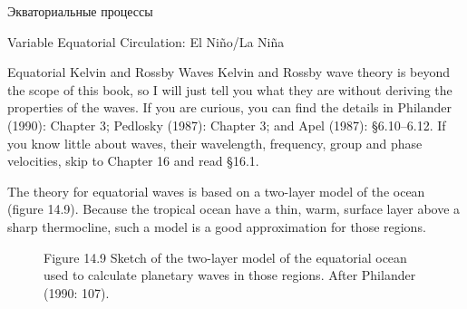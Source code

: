 \begin{chapter}{Экваториальные процессы}
\begin{section}{Variable Equatorial Circulation: El Ni\~{n}o/La Ni\~{n}a}
\begin{paragraph}{Equatorial Kelvin and Rossby Waves}
Kelvin and Rossby wave theory is beyond the scope
of this book, so I will just tell you what they are without deriving
the properties of the waves. If you are curious, you can find the
details in Philander (1990): Chapter 3; Pedlosky (1987): Chapter 3;
and Apel (1987): \S6.10--6.12. If you know little about waves, their
wavelength, frequency, group and phase velocities, skip to Chapter 16
and read \S16.1.
%

The theory for equatorial waves is based on a two-layer model of the
ocean (figure 14.9). Because the tropical ocean have a thin, warm,
surface layer above a sharp thermocline,
such a model is a good approximation for those regions.
%

\begin{figure}[t!]
\begin{center}
\end{center}
\caption{Figure 14.9 Sketch of the two-layer model of the
equatorial ocean used to calculate planetary waves in those
regions. After Philander (1990: 107).}
\label{fig:modelsketch}
\end{figure}
%


\end{paragraph}
\end{section}
\end{chapter}

